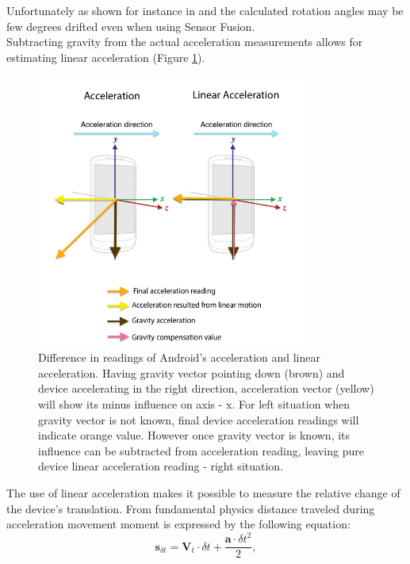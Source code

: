 Unfortunately as shown for instance in \cite{sensorFusionSmartphones} and \cite{website:extendedSensorFusion} the calculated rotation angles may be few degrees drifted even when using Sensor Fusion. 
\\
Subtracting gravity from the actual acceleration measurements allows for estimating linear acceleration (Figure \ref{fig:linear_acceleration}). 
\begin{figure}[h!]
    \centering
    \includegraphics[width=0.8\textwidth]{linear_acceleration}
    \caption[Difference in readings of Android's acceleration and linear acceleration]{Difference in readings of Android's acceleration and linear acceleration. Having gravity vector pointing down (brown) and device accelerating in the right direction, acceleration vector (yellow) will show its minus influence on axis - x. For left situation when gravity vector is not known, final device acceleration readings will indicate orange value. However once gravity vector is known, its influence can be subtracted from acceleration reading, leaving pure device linear acceleration reading - right situation.}
    \label{fig:linear_acceleration}
\end{figure}
The use of linear acceleration makes it possible to measure the relative change of the device's translation. From fundamental physics distance traveled during acceleration movement moment is expressed by the following equation:
\begin{equation} \label{eq:trans_from_accel}
\textbf{s}_{\delta t} = \textbf{V}_{t} \cdot \delta t + \frac{\textbf{a} \cdot {\delta t}^{2}}{2},
\end{equation}

